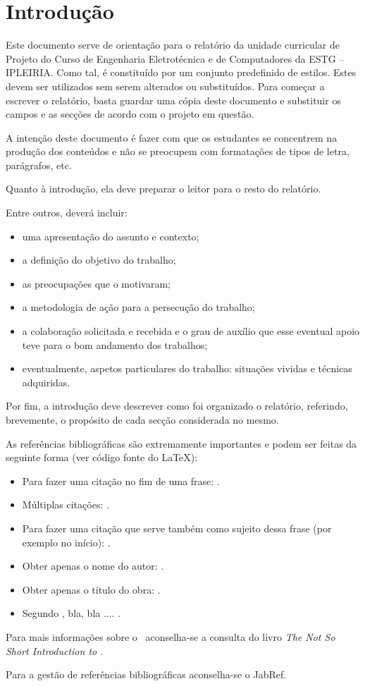 
\chapter{Introdução}
\label{ch:introduction}


Este documento serve de orientação para o relatório da unidade curricular de Projeto do Curso de Engenharia Eletrotécnica e de Computadores da ESTG – IPLEIRIA. Como tal, é constituído por um conjunto predefinido de estilos. Estes devem ser utilizados sem serem alterados ou substituídos. Para começar a escrever o relatório, basta guardar uma cópia deste documento e substituir os campos e as secções de acordo com o projeto em questão.

A intenção deste documento é fazer com que os estudantes se concentrem na produção dos conteúdos e não se preocupem com formatações de tipos de letra, parágrafos, etc.

Quanto à introdução, ela deve preparar o leitor para o resto do relatório.

Entre outros, deverá incluir:
\begin{itemize}
\item uma apresentação do assunto e contexto;
\item a definição do objetivo do trabalho;
\item as preocupações que o motivaram;
\item a metodologia de ação para a persecução do trabalho;
\item a colaboração solicitada e recebida e o grau de auxílio que esse eventual apoio teve para o bom andamento dos trabalhos;
\item eventualmente, aspetos particulares do trabalho: situações vividas e técnicas adquiridas.
\end{itemize}

Por fim, a introdução deve descrever como foi organizado o relatório, referindo, brevemente, o propósito de cada secção considerada no mesmo.

As referências bibliográficas são extremamente importantes e podem ser feitas da seguinte forma (ver código fonte do \LaTeX): 
\begin{itemize}
    \item Para fazer uma citação no fim de uma frase: \parencite{Sims1992}. 
    \item Múltiplas citações: \parencite{Darwin1859,Koza1992}.
    \item Para fazer uma citação que serve também como sujeito dessa frase (por exemplo no início): \textcite{Sims1992}.
    \item Obter apenas o nome do autor: \citeauthor{Sims1992}.
    \item Obter apenas o título do obra: .
    \item Segundo \textcite{Rudolph2016}, bla, bla .... .
\end{itemize}

Para mais informações sobre o \LaTeXe\ aconselha-se a consulta do livro \emph{The Not So Short Introduction to \LaTeXe} \parencite{oetiker2000nss}.

Para a gestão de referências bibliográficas aconselha-se o JabRef. %